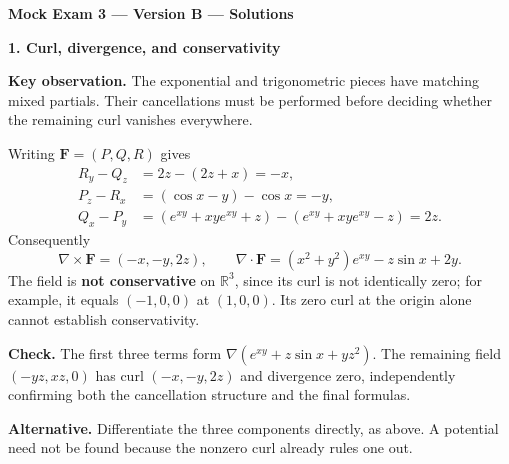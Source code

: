 \documentclass[11pt,letterpaper]{article}
\newcommand{\curl}{\nabla\times}
\newcommand{\dv}{\nabla\cdot}
\renewcommand{\vec}[1]{\mathbf{#1}}
\newcommand{\grad}{\nabla}
\newcommand{\solutionproblem}[3]{%
  \par\bigskip\Needspace{7\baselineskip}
  \noindent\textbf{#1. #2}\par\nobreak
}
\newcommand{\insight}[1]{\par\textbf{Key observation.} #1\par}
\newcommand{\verification}[1]{\par\textbf{Check.} #1\par}
\newcommand{\alternative}[1]{\par\textbf{Alternative.} #1\par}
\begin{document}
\clearpage
\setcounter{page}{1}
{\large\bfseries Mock Exam 3 --- Version B --- Solutions}
\smallskip
\solutionproblem{1}{Curl, divergence, and conservativity}{10}
\insight{The exponential and trigonometric pieces have matching mixed
partials. Their cancellations must be performed before deciding whether
the remaining curl vanishes everywhere.}
Writing $\vec F=(P,Q,R)$ gives
\[
\begin{aligned}
R_y-Q_z&=2z-(2z+x)=-x,\\
P_z-R_x&=(\cos x-y)-\cos x=-y,\\
Q_x-P_y&=(e^{xy}+xye^{xy}+z)
 -(e^{xy}+xye^{xy}-z)=2z.
\end{aligned}
\]
Consequently
\[
\boxed{\curl\vec F=(-x,-y,2z)},\qquad
\boxed{\dv\vec F=(x^2+y^2)e^{xy}-z\sin x+2y}.
\]
The field is \textbf{not conservative} on $\mathbb R^3$, since its curl
is not identically zero; for example, it equals $(-1,0,0)$ at $(1,0,0)$.
Its zero curl at the origin alone cannot establish conservativity.
\verification{The first three terms form
$\grad(e^{xy}+z\sin x+yz^2)$. The remaining field
$(-yz,xz,0)$ has curl $(-x,-y,2z)$ and divergence zero, independently
confirming both the cancellation structure and the final formulas.}
\alternative{Differentiate the three components directly, as above. A
potential need not be found because the nonzero curl already rules one
out.}
\end{document}
